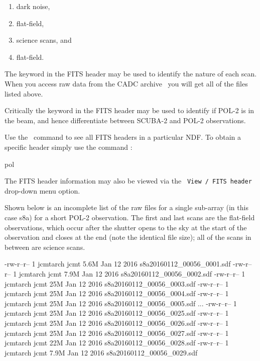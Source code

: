 \begin{enumerate}\itemsep-0.2em
\item dark noise,
\item flat-field,
\item science scans, and
\item flat-field.
\end{enumerate}


The  keyword in the FITS header may be used to
identify the nature of each scan.  When you access raw data from the
CADC archive
\
you will get all of the files listed above.


Critically the  keyword in the FITS header may be used
to identify if POL-2 is in the beam, and hence differentiate between
SCUBA-2 and POL-2 observations.


\begin{tip}
  Use the \Kappa\ command  to
  see all FITS headers in a
  particular NDF. To obtain a specific header simply use the command
  \xref{\task{fitsval}}{sun95}{FITSVAL} :
  \begin{terminalv}
pol
\end{terminalv}
The FITS header information may also be viewed via the \gaia\
\texttt{View / FITS header} drop-down menu option.
\end{tip}

Shown below is an incomplete list of the raw files for a single
sub-array (in this case s8a) for a short POL-2 observation. The first
and last scans are the flat-field observations, which occur after the
shutter opens to the sky at the start of the observation and closes at
the end (note the identical file size); all of the scans in between
are science scans.


\begin{terminalv}
\end{terminalv}

\begin{terminalv}
-rw-r--r-- 1 jcmtarch jcmt 5.6M Jan 12  2016 s8a20160112_00056_0001.sdf
-rw-r--r-- 1 jcmtarch jcmt 7.9M Jan 12  2016 s8a20160112_00056_0002.sdf
-rw-r--r-- 1 jcmtarch jcmt  25M Jan 12  2016 s8a20160112_00056_0003.sdf
-rw-r--r-- 1 jcmtarch jcmt  25M Jan 12  2016 s8a20160112_00056_0004.sdf
-rw-r--r-- 1 jcmtarch jcmt  25M Jan 12  2016 s8a20160112_00056_0005.sdf
...
-rw-r--r-- 1 jcmtarch jcmt  25M Jan 12  2016 s8a20160112_00056_0025.sdf
-rw-r--r-- 1 jcmtarch jcmt  25M Jan 12  2016 s8a20160112_00056_0026.sdf
-rw-r--r-- 1 jcmtarch jcmt  25M Jan 12  2016 s8a20160112_00056_0027.sdf
-rw-r--r-- 1 jcmtarch jcmt  22M Jan 12  2016 s8a20160112_00056_0028.sdf
-rw-r--r-- 1 jcmtarch jcmt 7.9M Jan 12  2016 s8a20160112_00056_0029.sdf
\end{terminalv}

